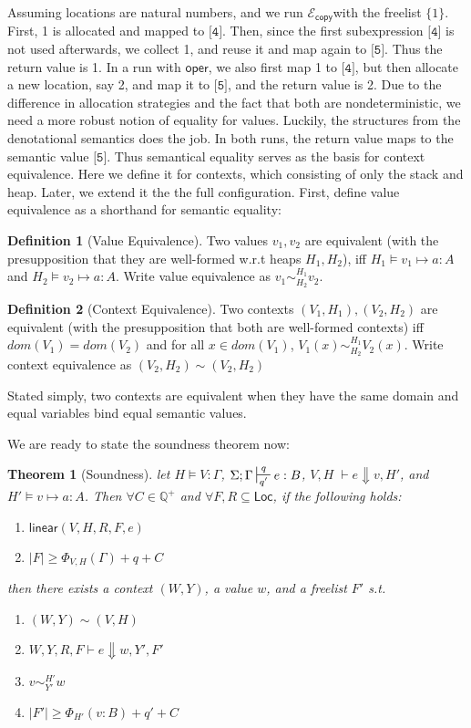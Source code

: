 \documentclass{easychair}
\newtheorem{theorem}{Theorem}
\newcommand{\ms}[1]{\ensuremath{\mathsf{#1}}}
\newcommand{\wfc}[5]{\mathsf{linear}(#1,#2,#3,#4,#5)}
\newcommand{\veq}[4]{#3 \sim^{#1}_{#2} #4}
\newcommand{\ctxeq}[2]{(#1) \sim (#2)}
\newcommand{\copySem}{\ensuremath{\mathcal{E}_{\ms{copy}}}}
\theoremstyle{definition}
\newtheorem{definition}{Definition}
\begin{document}
Assuming locations are natural numbers, and we run \copySem with the freelist $\{1\}$. 
First, 1 is allocated and mapped to $\texttt{[4]}$. 
Then, since the first subexpression $\texttt{[4]}$ is not used afterwards, we collect 1, and reuse it
and map again to $\texttt{[5]}$. Thus the return value is 1.  In a run with $\ms{oper}$, 
we also first map 1 to $\texttt{[4]}$, but then 
allocate a new location, say 2, and map it to $\texttt{[5]}$, and the return value is 2. Due to the 
difference in allocation strategies and the fact that both are nondeterministic, we need a more 
robust notion of equality for values. Luckily, the structures from the denotational semantics 
does the job. In both runs, the return value maps to the semantic value $\texttt{[5]}$.
Thus semantical equality serves as the basis for context equivalence. 
Here we define it for contexts, which consisting of only the stack and heap. 
Later, we extend it the the full configuration. First, define value equivalence as
a shorthand for semantic equality: 

\begin{definition}[Value Equivalence]
Two values $v_1,v_2$ are equivalent (with the presupposition that they are well-formed w.r.t heaps $H_1,H_2$),
iff $H_1 \vDash v_1 \mapsto a : A$ and $H_2 \vDash v_2 \mapsto a : A$. 
Write value equivalence as $\veq{H_1}{H_2}{v_1}{v_2}$.
\end{definition}

\begin{definition}[Context Equivalence]
Two contexts $(V_1,H_1), (V_2,H_2)$ are equivalent
(with the presupposition that both are well-formed contexts) iff $dom(V_1) = dom(V_2)$ and 
for all $x \in dom(V_1)$, $\veq{H_1}{H_2}{V_1(x)}{V_2(x)}$. Write context equivalence as 
$\ctxeq{V_2,H_2}{V_2,H_2}$
\end{definition}

Stated simply, two contexts are equivalent when they have the same domain and equal variables bind 
equal semantic values. 


We are ready to state the soundness theorem now:

\begin{theorem}[Soundness]
\label{itm:soundness} let $H \vDash V : \Gamma$, $\Sigma; \Gamma \sststile{q'}{q} e : B$,
$V,H \; \vdash e \Downarrow v, H'$, and $H' \vDash v \mapsto a : A$.
Then $\forall C \in \mathbb{Q}^{+}$ and $\forall F,R \subseteq \ms{Loc}$,
if the following holds:
\begin{enumerate} 
\item $\wfc{V}{H}{R}{F}{e}$
\item $|F| \ge \Phi_{V,H}(\Gamma) + q + C$ 
\end{enumerate}
then there exists a context $(W,Y)$, a value $w$, and a freelist $F'$ s.t.
\begin{enumerate}
	\item $\ctxeq{W,Y}{V,H}$
  \item $W,Y,R,F \vdash e \Downarrow w, Y', F'$
	\item $\veq{H'}{Y'}{v}{w}$
  \item $|F'| \ge \Phi_{H'}(v:B) + q' + C$
\end{enumerate}
\end{theorem}
\end{document}
